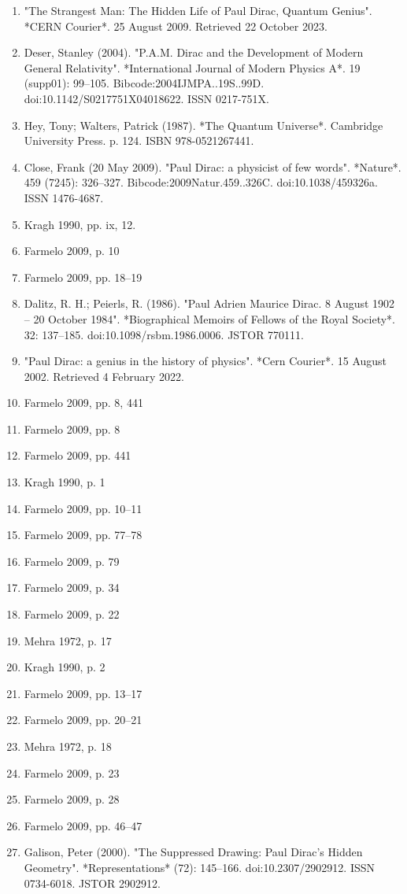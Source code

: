 \begin{enumerate}
\item "The Strangest Man: The Hidden Life of Paul Dirac, Quantum Genius". *CERN Courier*. 25 August 2009. Retrieved 22 October 2023.
\item Deser, Stanley (2004). "P.A.M. Dirac and the Development of Modern General Relativity". *International Journal of Modern Physics A*. 19 (supp01): 99–105. Bibcode:2004IJMPA..19S..99D. doi:10.1142/S0217751X04018622. ISSN 0217-751X.
\item Hey, Tony; Walters, Patrick (1987). *The Quantum Universe*. Cambridge University Press. p. 124. ISBN 978-0521267441.
\item Close, Frank (20 May 2009). "Paul Dirac: a physicist of few words". *Nature*. 459 (7245): 326–327. Bibcode:2009Natur.459..326C. doi:10.1038/459326a. ISSN 1476-4687.
\item Kragh 1990, pp. ix, 12.
\item Farmelo 2009, p. 10
\item Farmelo 2009, pp. 18–19
\item Dalitz, R. H.; Peierls, R. (1986). "Paul Adrien Maurice Dirac. 8 August 1902 – 20 October 1984". *Biographical Memoirs of Fellows of the Royal Society*. 32: 137–185. doi:10.1098/rsbm.1986.0006. JSTOR 770111.
\item "Paul Dirac: a genius in the history of physics". *Cern Courier*. 15 August 2002. Retrieved 4 February 2022.
\item Farmelo 2009, pp. 8, 441
\item Farmelo 2009, pp. 8
\item Farmelo 2009, pp. 441
\item Kragh 1990, p. 1
\item Farmelo 2009, pp. 10–11
\item Farmelo 2009, pp. 77–78
\item Farmelo 2009, p. 79
\item Farmelo 2009, p. 34
\item Farmelo 2009, p. 22
\item Mehra 1972, p. 17
\item Kragh 1990, p. 2
\item Farmelo 2009, pp. 13–17
\item Farmelo 2009, pp. 20–21
\item Mehra 1972, p. 18
\item Farmelo 2009, p. 23
\item Farmelo 2009, p. 28
\item Farmelo 2009, pp. 46–47
\item Galison, Peter (2000). "The Suppressed Drawing: Paul Dirac's Hidden Geometry". *Representations* (72): 145–166. doi:10.2307/2902912. ISSN 0734-6018. JSTOR 2902912.

\end{enumerate}
